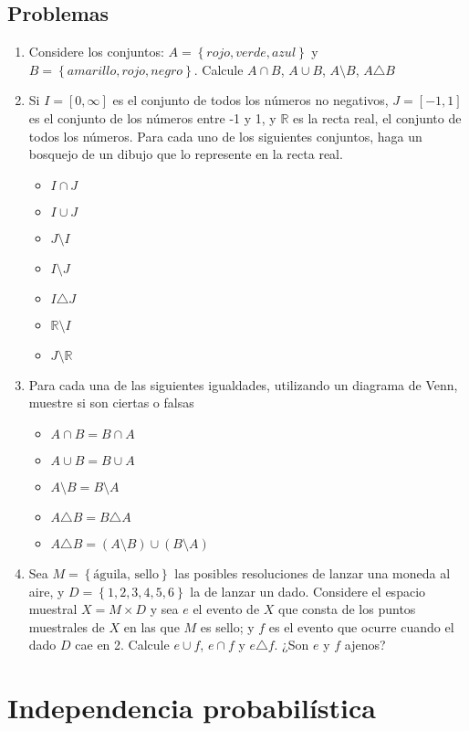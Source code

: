 \documentclass[spanish]{report}
\begin{document}
\subsection{Problemas}

\begin{enumerate}
\item Considere los conjuntos: $A= \left\lbrace rojo, verde, azul \right\rbrace$ y $ B = \left\lbrace amarillo, rojo, negro \right\rbrace$. Calcule $A \cap B$, $A \cup B$, $A \setminus B$, $A \triangle B$

\item Si $I = [0, \infty]$ es el conjunto de todos los números no negativos, $J=[-1, 1]$ es el conjunto de los números entre -1 y 1, y $\mathbb{R}$ es la recta real, el conjunto de todos los números. Para cada uno de los siguientes conjuntos, haga un bosquejo de un dibujo que lo represente en la recta real.
\begin{multicols}{4}\begin{itemize}
	\item $I \cap J$ \item $I \cup J$ \item $J \setminus I$ \item $I \setminus J$ \item $I \triangle J$ \item $\mathbb{R} \setminus I$ \item $J \setminus \mathbb{R}$
\end{itemize}\end{multicols}

\item Para cada una de las siguientes igualdades, utilizando un diagrama de Venn, muestre si son ciertas o falsas
\begin{multicols}{2}\begin{itemize}
	\item $A \cap B = B \cap A$ 
	\item $A \cup B = B \cup A$ 
	\item $A \setminus B = B \setminus A$
	\item $A \triangle B = B \triangle A$
	\item $A \triangle B = (A \setminus B) \cup (B \setminus A)$
\end{itemize}\end{multicols}

\item Sea $M=\left\lbrace \text{águila, sello} \right\rbrace$ las posibles resoluciones de lanzar una moneda al aire, y $D = \left\lbrace 1,2,3,4,5,6 \right\rbrace$ la de lanzar un dado. Considere el espacio muestral $X = M \times D$ y sea $e$ el evento de $X$ que consta de los puntos muestrales de $X$ en las que $M$ es sello; y $f$ es el evento que ocurre cuando el dado $D$ cae en 2.
Calcule $e \cup f$, $e \cap f$ y $e \triangle f$. ¿Son $e$ y $f$ ajenos?
\end{enumerate}

\section{Independencia probabilística}

\end{document}
